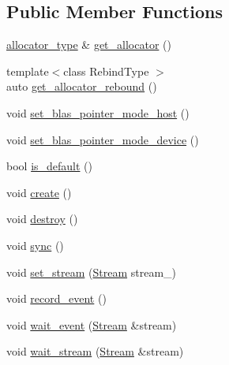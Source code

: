 \subsection*{Public Member Functions}
\begin{DoxyCompactItemize}
\item 
\hyperlink{classbc_1_1streams_1_1Stream_3_01host__tag_01_4_a98a9510a8d26077263d3acab43094669}{allocator\+\_\+type} \& \hyperlink{classbc_1_1streams_1_1Stream_3_01host__tag_01_4_af4da3a7dc60211b9482e8836bfbc1b77}{get\+\_\+allocator} ()
\item 
{\footnotesize template$<$class Rebind\+Type $>$ }\\auto \hyperlink{classbc_1_1streams_1_1Stream_3_01host__tag_01_4_a3f7154f5a495bdfda00e73460da2ee0b}{get\+\_\+allocator\+\_\+rebound} ()
\item 
void \hyperlink{classbc_1_1streams_1_1Stream_3_01host__tag_01_4_ae12dc96406db0db0027b76f22aaa1f3b}{set\+\_\+blas\+\_\+pointer\+\_\+mode\+\_\+host} ()
\item 
void \hyperlink{classbc_1_1streams_1_1Stream_3_01host__tag_01_4_aa3fb17c834a0a12750b4d8d640eaf167}{set\+\_\+blas\+\_\+pointer\+\_\+mode\+\_\+device} ()
\item 
bool \hyperlink{classbc_1_1streams_1_1Stream_3_01host__tag_01_4_aab5f83cbae35b40c8adc0be7cd25bcab}{is\+\_\+default} ()
\item 
void \hyperlink{classbc_1_1streams_1_1Stream_3_01host__tag_01_4_a8100f3390eec2c63d64325bd87c52599}{create} ()
\item 
void \hyperlink{classbc_1_1streams_1_1Stream_3_01host__tag_01_4_adf7c44baa51a5a33383817218604f732}{destroy} ()
\item 
void \hyperlink{classbc_1_1streams_1_1Stream_3_01host__tag_01_4_a2126e518e753382cd89c26e32cc4f186}{sync} ()
\item 
void \hyperlink{classbc_1_1streams_1_1Stream_3_01host__tag_01_4_a957060b76bc29337c1634e63d8ee2c75}{set\+\_\+stream} (\hyperlink{classbc_1_1streams_1_1Stream}{Stream} stream\+\_\+)
\item 
void \hyperlink{classbc_1_1streams_1_1Stream_3_01host__tag_01_4_a85dcfc187b94fd5f136d2c134e0ed58f}{record\+\_\+event} ()
\item 
void \hyperlink{classbc_1_1streams_1_1Stream_3_01host__tag_01_4_ac02577226ce966ddce1faa09b572c3ca}{wait\+\_\+event} (\hyperlink{classbc_1_1streams_1_1Stream}{Stream} \&stream)
\item 
void \hyperlink{classbc_1_1streams_1_1Stream_3_01host__tag_01_4_a4fad8fd543a537f0990407c5e46ba5e2}{wait\+\_\+stream} (\hyperlink{classbc_1_1streams_1_1Stream}{Stream} \&stream)

\end{DoxyCompactItemize}
